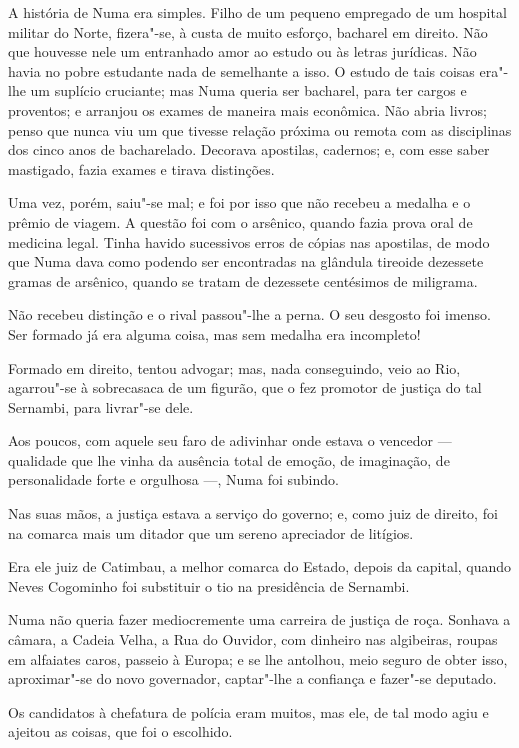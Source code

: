 A história de Numa era simples. Filho de um pequeno empregado de um
hospital militar do Norte, fizera"-se, à custa de muito esforço, bacharel
em direito. Não que houvesse nele um entranhado amor ao estudo ou às
letras jurídicas. Não havia no pobre estudante nada de semelhante a
isso. O estudo de tais coisas era"-lhe um suplício cruciante; mas Numa
queria ser bacharel, para ter cargos e proventos; e arranjou os exames
de maneira mais econômica. Não abria livros; penso que nunca viu um que
tivesse relação próxima ou remota com as disciplinas dos cinco anos de
bacharelado. Decorava apostilas, cadernos; e, com esse saber mastigado,
fazia exames e tirava distinções.

Uma vez, porém, saiu"-se mal; e foi por isso que não recebeu a medalha e
o prêmio de viagem. A questão foi com o arsênico, quando fazia prova
oral de medicina legal. Tinha havido sucessivos erros de cópias nas
apostilas, de modo que Numa dava como podendo ser encontradas na
glândula tireoide dezessete gramas de arsênico, quando se tratam de
dezessete centésimos de miligrama.

Não recebeu distinção e o rival passou"-lhe a perna. O seu desgosto foi
imenso. Ser formado já era alguma coisa, mas sem medalha era incompleto!

Formado em direito, tentou advogar; mas, nada conseguindo, veio ao Rio,
agarrou"-se à sobrecasaca de um figurão, que o fez promotor de justiça do
tal Sernambi, para livrar"-se dele.

Aos poucos, com aquele seu faro de adivinhar onde estava o vencedor ---
qualidade que lhe vinha da ausência total de emoção, de imaginação, de
personalidade forte e orgulhosa ---, Numa foi subindo.

Nas suas mãos, a justiça estava a serviço do governo; e, como juiz de
direito, foi na comarca mais um ditador que um sereno apreciador de
litígios.

Era ele juiz de Catimbau, a melhor comarca do Estado, depois da capital,
quando Neves Cogominho foi substituir o tio na presidência de Sernambi.

Numa não queria fazer mediocremente uma carreira de justiça de roça.
Sonhava a câmara, a Cadeia Velha, a Rua do Ouvidor, com dinheiro nas
algibeiras, roupas em alfaiates caros, passeio à Europa; e se lhe
antolhou, meio seguro de obter isso, aproximar"-se do novo governador,
captar"-lhe a confiança e fazer"-se deputado.

Os candidatos à chefatura de polícia eram muitos, mas ele, de tal modo
agiu e ajeitou as coisas, que foi o escolhido.

